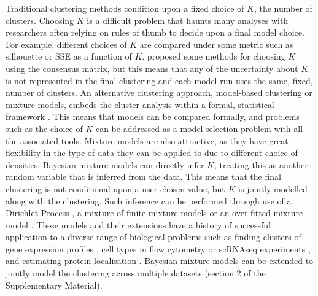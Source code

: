 \documentclass{bmcart}
\begin{document}
Traditional clustering methods condition upon a fixed choice of $K$, the number of clusters. Choosing $K$ is a difficult problem that haunts many analyses with researchers often relying on rules of thumb to decide upon a final model choice. For example, different choices of $K$ are compared under some metric such as silhouette or SSE as a function of $K$. \cite{monti2003consensus} proposed some methods for choosing $K$ using the consensus matrix, but this means that any of the uncertainty about $K$ is not represented in the final clustering and each model run uses the same, fixed, number of clusters. An alternative clustering approach, model-based clustering or mixture models, embeds the cluster analysis within a formal, statistical framework \citep{fraley2002model}. This means that models can be compared formally, and problems such as the choice of $K$ can be addressed as a model selection problem with all the associated tools. Mixture models are also attractive, as they have great flexibility in the type of data they can be applied to due to different choice of densities. Bayesian mixture models can directly infer $K$, treating this as another random variable that is inferred from the data. This means that the final clustering is not conditional upon a user chosen value, but $K$ is jointly modelled along with the clustering. Such inference can be performed through use of a Dirichlet Process \citep{ferguson1973bayesian}, a mixture of finite mixture models \citep{richardson1997bayesian, miller2018mixture} or an over-fitted mixture model \citep{rousseau2011asymptotic}. These models and their extensions have a history of successful application to a diverse range of biological problems such as finding clusters of gene expression profiles \citep{medvedovic2002bayesian}, cell types in flow cytometry \citep{chan2008statistical, hejblum2019sequential} or scRNAseq experiments \citep{prabhakaran2016dirichlet}, and estimating protein localisation \citep{crook2018bayesian}. Bayesian mixture models can be extended to jointly model the clustering across multiple datasets \citep{kirk2012bayesian, gabasova2017clusternomics} (section 2 of the Supplementary Material).

\end{document}
